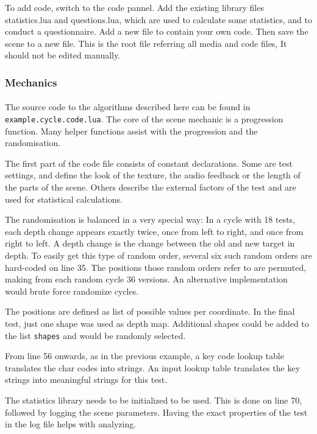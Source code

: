 To add code, switch to the code pannel.
Add the existing library files statistics.lua and questions.lua, which are used to calculate some statistics, and to conduct a questionnaire.
Add a new file to contain your own code.
Then save the scene to a new file.
This is the root file referring all media and code files, It should not be edited manually.

\subsubsection{Mechanics}
\paragraph{}
The source code to the algorithms described here can be found in \texttt{example.cycle.code.lua}.
The core of the scene mechanic is a progression function.
Many helper functions assist with the progression and the randomisation.

The first part of the code file consists of constant declarations.
Some are test settings, and define the look of the texture, the audio feedback or the length of the parts of the scene.
Others describe the external factors of the test and are used for statistical calculations.

The randomisation is balanced in a very special way:
In a cycle with 18 tests, each depth change appears exactly twice, once from left to right, and once from right to left.
A depth change is the change between the old and new target in depth.
To easily get this type of random order, several six such random orders are hard-coded on line 35.
The positions those random orders refer to are permuted, making from each random cycle 36 versions.
An alternative implementation would brute force randomize cycles.

The positions are defined as list of possible values per coordinate.
In the final test, just one shape was used as depth map.
Additional shapes could be added to the list \texttt{shapes} and would be randomly selected.

From line 56 onwards, as in the previous example, a key code lookup table translates the char codes into strings.
An input lookup table translates the key strings into meaningful strings for this test.

The statistics library needs to be initialized to be used.
This is done on line 70, followed by logging the scene parameters.
Having the exact properties of the test in the log file helps with analyzing.

